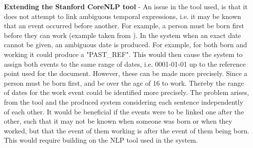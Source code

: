 \par \textbf{Extending the Stanford CoreNLP tool} - An issue in the tool used, is that it does not attempt to link ambiguous temporal expressions, i.e. it may be known that an event occurred before another. For example, a person must be born first before they can work (example taken from \cite{mccloskymanning2012}). In the system when an exact date cannot be given, an ambiguous date is produced. For example, for both born and working it could produce a "PAST\_REF". This would then cause the system to assign both events to the same range of dates, i.e. 0001-01-01 up to the reference point used for the document. However, these can be made more precisely.  Since a person must be born first, and be over the age of 16 to work. Thereby the range of dates for the work event could be identified more precisely. The problem arises, from the tool and the produced system considering each sentence independently of each other. It would be beneficial if the events were to be linked one after the other, such that it may not be known when someone was born or when they worked, but that the event of them working is after the event of them being born. This would require building on the NLP tool used in the system.